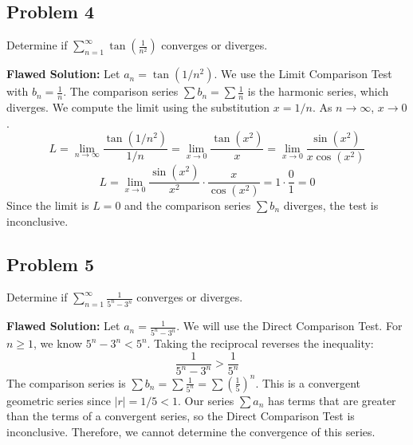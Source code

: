 \documentclass{article}
\begin{document}
\subsection{Problem 4}
Determine if \(\sum_{n=1}^{\infty} \tan\left(\frac{1}{n^2}\right)\) converges or diverges.

\textbf{Flawed Solution:}
Let \(a_n = \tan(1/n^2)\). We use the Limit Comparison Test with \(b_n = \frac{1}{n}\).
The comparison series \(\sum b_n = \sum \frac{1}{n}\) is the harmonic series, which diverges.
We compute the limit using the substitution \(x = 1/n\). As \(n \to \infty\), \(x \to 0\).
\[ L = \lim_{n \to \infty} \frac{\tan(1/n^2)}{1/n} = \lim_{x \to 0} \frac{\tan(x^2)}{x} = \lim_{x \to 0} \frac{\sin(x^2)}{x \cos(x^2)} \]
\[ L = \lim_{x \to 0} \frac{\sin(x^2)}{x^2} \cdot \frac{x}{\cos(x^2)} = 1 \cdot \frac{0}{1} = 0 \]
Since the limit is \(L=0\) and the comparison series \(\sum b_n\) diverges, the test is inconclusive.

\subsection{Problem 5}
Determine if \(\sum_{n=1}^{\infty} \frac{1}{5^n - 3^n}\) converges or diverges.

\textbf{Flawed Solution:}
Let \(a_n = \frac{1}{5^n - 3^n}\). We will use the Direct Comparison Test.
For \(n \geq 1\), we know \(5^n - 3^n < 5^n\).
Taking the reciprocal reverses the inequality:
\[ \frac{1}{5^n - 3^n} > \frac{1}{5^n} \]
The comparison series is \(\sum b_n = \sum \frac{1}{5^n} = \sum (\frac{1}{5})^n\). This is a convergent geometric series since \(|r|=1/5 < 1\).
Our series \(\sum a_n\) has terms that are greater than the terms of a convergent series, so the Direct Comparison Test is inconclusive. Therefore, we cannot determine the convergence of this series.
\end{document}
